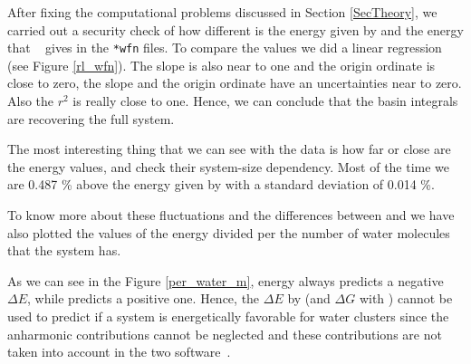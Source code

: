 After fixing the computational problems discussed in Section \ref{SecTheory},
we carried out a security check of how different is the energy given by
{} and the energy that {}~\cite{g16} gives in the
\texttt{*wfn} files. To compare the values we did a linear regression (see
Figure \ref{rl_wfn}). The slope is  also near to one and the origin ordinate
is close to zero, the slope and the origin ordinate have an uncertainties near
to zero. Also the $r^2$ is really close to one. Hence, we can conclude that the
basin integrals are recovering the full system.

The most interesting thing that we can see with the data is how far or close
are the energy {} values, and check their system-size dependency.
Most of the time we are 0.487 \% above the energy given by {}
with a standard deviation of 0.014 \%.

To know more about these fluctuations and the differences between
{} and {} we have also plotted the values of the
energy divided per the number of water molecules that the system has.

As we can see in the Figure \ref{per_water_m}, {} energy always
predicts a negative $\Delta E$, while {} predicts a positive one.
Hence, the $\Delta E$ by {} (and $\Delta G$ with {})
cannot be used to predict if a system is energetically favorable for water
clusters since the anharmonic contributions cannot be neglected and these
contributions are not taken into account in the two
software~\cite{MuozCaro1997}.

